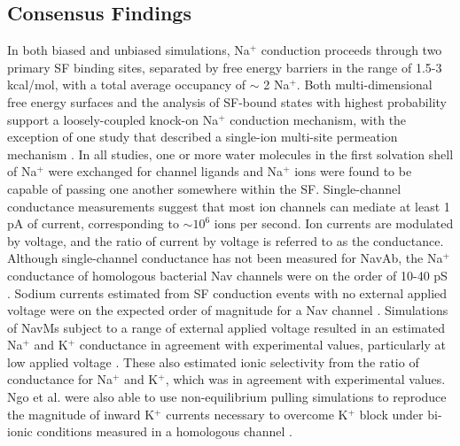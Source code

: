 \begin{refsection}
 \subsection{Consensus Findings}
 In both biased and unbiased simulations, Na$^{+}$ conduction proceeds through two primary SF binding sites, separated by free energy barriers in the range of 1.5-3 kcal/mol, with a total average occupancy of $\sim$ 2 Na$^{+}$.  Both multi-dimensional free energy surfaces and the analysis of SF-bound states with highest probability support a loosely-coupled knock-on Na$^{+}$ conduction mechanism, with the exception of one study that described a single-ion multi-site permeation mechanism \cite{Ulmschneider:2013da}.  In all studies, one or more water molecules in the first solvation shell of Na$^{+}$ were exchanged for channel ligands and Na$^{+}$ ions were found to be capable of passing one another somewhere within the SF.
Single-channel conductance measurements suggest that most ion channels can mediate at least 1 pA of current, corresponding to $\sim 10^{6}$ ions per second. Ion currents are modulated by voltage, and the ratio of current by voltage is referred to as the conductance.  Although single-channel conductance has not been measured for NavAb, the Na$^{+}$ conductance of homologous bacterial Nav channels were on the order of 10-40 pS \cite{Shaya:2011ih,Ulmschneider:2013da,Ren:2001uo}.  Sodium currents estimated from SF conduction events with no external applied voltage were on the expected order of magnitude for a Nav channel \cite{Chakrabarti:2013kd}.  Simulations of NavMs subject to a range of external applied voltage resulted in an estimated Na$^{+}$ and K$^{+}$ conductance in agreement with experimental values, particularly at low applied voltage \cite{Ulmschneider:2013da}. These also estimated ionic selectivity from the ratio of conductance for Na$^{+}$ and K$^{+}$, which was in agreement with experimental values. Ngo et al. \cite{Ngo:2016es} were also able to use non-equilibrium pulling simulations to reproduce the magnitude of inward K$^{+}$ currents necessary to overcome K$^{+}$ block under bi-ionic conditions measured in a homologous channel \cite{FinolUrdaneta:2014bz}. 
 

\end{refsection}
